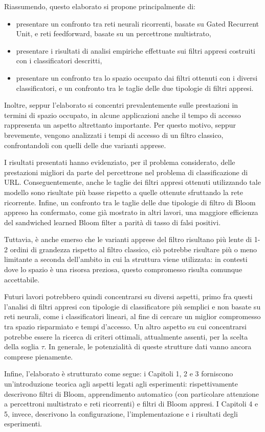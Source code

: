 \documentclass[4apaper,11pt]{article}
\begin{document}
Riassumendo, questo elaborato si propone principalmente di: 
\begin{itemize}
    \item presentare un confronto tra reti neurali ricorrenti, basate su Gated Recurrent Unit, e reti feedforward, basate su un percettrone multistrato,
    \item presentare i risultati di analisi empiriche effettuate sui filtri appresi costruiti con i classificatori descritti,
    \item presentare un confronto tra lo spazio occupato dai filtri ottenuti con i diversi classificatori, e un confronto tra le taglie delle due tipologie di filtri appresi.
\end{itemize}
Inoltre, seppur l'elaborato si concentri prevalentemente sulle prestazioni in termini di spazio occupato, in alcune applicazioni anche il tempo di accesso rappresenta un aspetto altrettanto importante. Per questo motivo, seppur brevemente, vengono analizzati i tempi di accesso di un filtro classico, confrontandoli con quelli delle due varianti apprese. 

I risultati presentati hanno evidenziato, per il problema considerato, delle prestazioni migliori da parte del percettrone nel problema di classificazione di URL. Conseguentemente, anche le taglie dei filtri appresi ottenuti utilizzando tale modello sono risultate più basse rispetto a quelle ottenute sfruttando la rete ricorrente. Infine, un confronto tra le taglie delle due tipologie di filtro di Bloom appreso ha confermato, come già mostrato in altri lavori, una maggiore efficienza del sandwiched learned Bloom filter a parità di tasso di falsi positivi.

Tuttavia, è anche emerso che le varianti apprese del filtro risultano più lente di 1-2 ordini di grandezza rispetto al filtro classico, ciò potrebbe risultare più o meno limitante a seconda dell'ambito in cui la struttura viene utilizzata: in contesti dove lo spazio è una risorsa preziosa, questo compromesso risulta comunque accettabile. 

Futuri lavori potrebbero quindi concentrarsi su diversi aspetti, primo fra questi l'analisi di filtri appresi con tipologie di classificatore più semplici e non basate su reti neurali, come i classificatori lineari, al fine di cercare un miglior compromesso tra spazio risparmiato e tempi d'accesso. Un altro aspetto su cui concentrarsi potrebbe essere la ricerca di criteri ottimali, attualmente assenti, per la scelta della soglia $\tau$. In generale, le potenzialità di queste strutture dati vanno ancora comprese pienamente.

Infine, l'elaborato è strutturato come segue: i Capitoli 1, 2 e 3 forniscono un'introduzione teorica agli aspetti legati agli esperimenti: rispettivamente descrivono filtri di Bloom, apprendimento automatico (con particolare attenzione a percettroni multistrato e reti ricorrenti) e filtri di Bloom appresi. I Capitoli 4 e 5, invece, descrivono la configurazione, l'implementazione e i risultati degli esperimenti. 
\printbibliography
\end{document}
